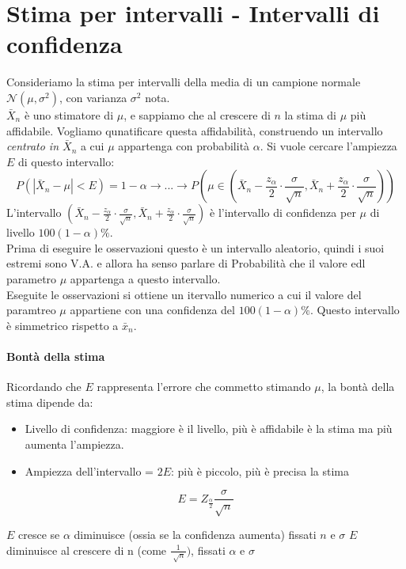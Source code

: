 \section{Stima per intervalli - Intervalli di confidenza}
Consideriamo la stima per intervalli della media di un campione normale $\mathcal{N}(\mu, \sigma^2)$, con
varianza $\sigma^2$ nota.
\\$\bar{X}_n$ è uno stimatore di $\mu$, e sappiamo che al crescere di $n$ la stima di $\mu$  più affidabile.
Vogliamo qunatificare questa affidabilità, construendo un intervallo \emph{centrato in $\bar{X}_n$} a cui $\mu$ appartenga con probabilità $\alpha$.
Si vuole cercare l'ampiezza $E$ di questo intervallo:
\[ P(|\bar{X}_n - \mu| < E) = 1-\alpha \to ... \to 
P(\mu \in (\bar{X}_n - \frac{z_\alpha}{2} \cdot \frac{\sigma}{\sqrt{n}},\bar{X}_n + \frac{z_\alpha}{2} \cdot \frac{\sigma}{\sqrt{n}}) )
\]
L'intervallo $(\bar{X}_n - \frac{z_\alpha}{2} \cdot \frac{\sigma}{\sqrt{n}},\bar{X}_n + \frac{z_\alpha}{2} \cdot \frac{\sigma}{\sqrt{n}})$
è l'intervallo di confidenza per $\mu$ di livello $100(1-\alpha)\%$.
\\Prima di eseguire le osservazioni questo è un intervallo aleatorio, quindi i suoi estremi sono V.A. e allora ha senso parlare di Probabilità
che il valore edl parametro $\mu$ appartenga a questo intervallo.
\\ Eseguite le osservazioni si ottiene un itervallo numerico a cui il valore del paramtreo $\mu$ appartiene con una confidenza del $100(1-\alpha)\%$.
Questo intervallo è simmetrico rispetto a $\bar{x}_n$.

\paragraph{Bontà della stima}
Ricordando che $E$ rappresenta l'errore che commetto stimando $\mu$, 
la bontà della stima dipende da:
\begin{itemize}
    \item Livello di confidenza: maggiore è il livello, più è affidabile è la stima ma più aumenta l'ampiezza.
    \item Ampiezza dell'intervallo = $2E$: più è piccolo, più è precisa la stima
\end{itemize}
\[
    E=Z_{\frac{\alpha}{2}}\frac{\sigma}{\sqrt{n}}
\]


$E$ cresce se $\alpha$ diminuisce (ossia se la confidenza aumenta) fissati $n$ e $\sigma$
$E$ diminuisce al crescere di n (come $\frac{1}{\sqrt[]{n}})$, fissati $\alpha$ e $\sigma$



